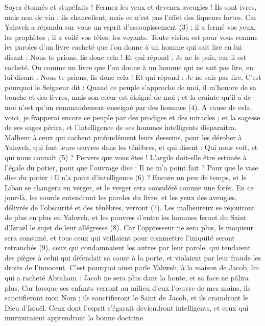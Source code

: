 \begin{multicols}{2}
Soyez étonnés et stupéfaits ! Fermez les yeux et devenez aveugles ! Ils sont ivres, mais non de vin ; ils chancellent, mais ce n’est pas l’effet des liqueurs fortes.
Car Yahweh a répandu sur vous un esprit d’assoupissement (3) ; il a fermé vos yeux, les prophètes ; il a voilé vos têtes, les voyants.
Toute vision est pour vous comme les paroles d'un livre cacheté que l’on donne à un homme qui sait lire en lui disant : Nous te prions, lis donc cela ! Et qui répond : Je ne le puis, car il est cacheté.
Ou comme un livre que l’on donne à un homme qui ne sait pas lire, en lui disant : Nous te prions, lis donc cela ! Et qui répond : Je ne sais pas lire.
C'est pourquoi le Seigneur dit : Quand ce peuple s'approche de moi, il m’honore de sa bouche et des lèvres, mais son cœur est éloigné de moi ; et la crainte qu’il a de moi n’est qu’un commandement enseigné par des hommes (4).
A cause de cela, voici, je frapperai encore ce peuple par des prodiges et des miracles ; et la sagesse de ses sages périra, et l'intelligence de ses hommes intelligents disparaîtra.
Malheur à ceux qui cachent profondément leurs desseins, pour les dérober à Yahweh, qui font leurs œuvres dans les ténèbres, et qui disent : Qui nous voit, et qui nous connaît (5) ?
Pervers que vous êtes ! L’argile doit-elle être estimée à l’égale du potier, pour que l’ouvrage dise : Il ne m’a point fait ? Pour que le vase dise du potier : Il n’a point d’intelligence (6) ?
Encore un peu de temps, et le Liban se changera en verger, et le verger sera considéré comme une forêt.
En ce jour-là, les sourds entendront les paroles du livre, et les yeux des aveugles, délivrés de l'obscurité et des ténèbres, verront (7).
Les malheureux se réjouiront de plus en plus en Yahweh, et les pauvres d'entre les hommes feront du Saint d'Israël le sujet de leur allégresse (8).
Car l’oppresseur ne sera plus, le moqueur sera consumé, et tous ceux qui veillaient pour commettre l'iniquité seront retranchés (9),
ceux qui condamnaient les autres par leur parole, qui tendaient des pièges à celui qui défendait sa cause à la porte, et violaient par leur fraude les droits de l’innocent.
C'est pourquoi ainsi parle Yahweh, à la maison de Jacob, lui qui a racheté Abraham : Jacob ne sera plus dans la honte, et sa face ne pâlira plus.
Car lorsque ses enfants verront au milieu d’eux l’œuvre de mes mains, ils sanctifieront mon Nom ; ils sanctifieront le Saint de Jacob, et ils craindront le Dieu d'Israël.
Ceux dont l'esprit s’égarait deviendront intelligents, et ceux qui murmuraient apprendront la bonne doctrine.

\end{multicols}
